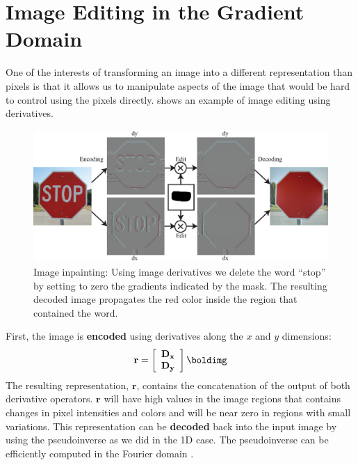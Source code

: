 \section{Image Editing in the Gradient Domain}
\label{section:editinggradientdomain}



One of the interests of transforming an image into a different representation than pixels is that it allows us to manipulate aspects of the image that would be hard to control using the pixels directly. \Fig{\ref{fig:edit_with_derivatives}} shows an example of image editing using derivatives. 

\begin{figure}
\centerline{
\includegraphics[width=1\linewidth]{figures/derivatives/stop_impainting.eps}
}
\caption{Image inpainting: Using image derivatives we delete the word ``stop'' by setting to zero  the gradients indicated by the mask. The resulting decoded image propagates the red color inside the region that contained the word.} 
\label{fig:edit_with_derivatives}
\end{figure}


First, the image is {\bf encoded} using derivatives along the $x$ and $y$ dimensions:
\begin{equation}
    \mathbf{r} = 
    \left[ 
    \begin{array}{c}
    \mathbf{D_x}  \\
    \mathbf{D_y} 
    \end{array}
    \right] 
    \boldimg 
\end{equation}
The resulting representation, $\mathbf{r}$, contains the concatenation of the output of  both derivative operators.  $\mathbf{r}$ will have high values in the image regions that contains changes in pixel intensities and colors and will be near zero in regions with small variations. This representation can be {\bf decoded} back into the input image by using the pseudoinverse as we did in the 1D case. The pseudoinverse can be efficiently computed in the Fourier domain \cite{Weiss01derivingintrinsic}.
 

